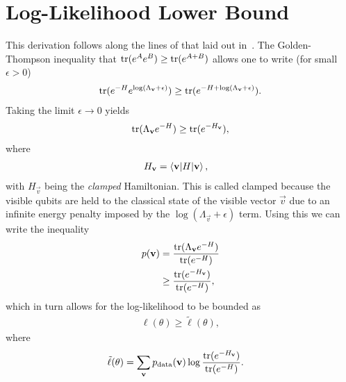 \section{Log-Likelihood Lower Bound}\label{app:qbm_log_likelihood_lower_bound}
This derivation follows along the lines of that laid out in~\cite{amin_2018}.
The Golden-Thompson inequality that \( \text{tr}(e^{A}e^{B}) \ge \text{tr}(e^{A+B}) \) allows one to write (for small \( \epsilon > 0 \))
\begin{align}
    \text{tr}(e^{-H} e^{\log(\Lambda_{\mathbf{v}}+\epsilon)}) \ge \text{tr}(e^{-H+\log(\Lambda_{\mathbf{v}}+\epsilon)}).
\end{align}
Taking the limit \( \epsilon \rightarrow 0 \) yields
\begin{align}
    \text{tr}(\Lambda_{\mathbf{v}}e^{-H}) \ge \text{tr}(e^{-H_{\mathbf{v}}}),
\end{align}
where
\begin{align}
    H_{\mathbf{v}} &= \braket{\mathbf{v} | H | \mathbf{v}},
\end{align}
with \( H_\vec{v} \) being the \textit{clamped} Hamiltonian.
This is called clamped because the visible qubits are held to the classical state of the visible vector \( \vec{v} \) due to an infinite energy penalty imposed by the \( \log(\Lambda_\vec{v} + \epsilon) \) term.
Using this we can write the inequality
\begin{align}
\begin{split}
    p(\mathbf{v})
        &= \frac{\text{tr}(\Lambda_{\mathbf{v}} e^{-H})}{\text{tr}(e^{-H})} \\
        &\ge \frac{\text{tr}(e^{-H_{\mathbf{v}}})}{\text{tr}(e^{-H})},
\end{split}
\end{align}
which in turn allows for the log-likelihood to be bounded as
\begin{align}
    \ell(\theta) \ge \tilde{\ell}(\theta),
\end{align}
where
\begin{align}
    \tilde{\ell}(\theta)
        &= \sum_{\mathbf{v}} p_\text{data}(\mathbf{v}) \log\frac{\text{tr}(e^{-H_{\mathbf{v}}})}{\text{tr}(e^{-H})}.
\end{align}
